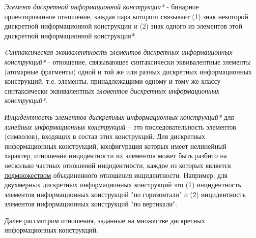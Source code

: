 \textit{Элемент дискретной информационной конструкции*} - бинарное ориентированное отношение, каждая пара которого связывает (1) знак некоторой дискретной информационной конструкции и (2) знак одного из элементов этой дискретной информационной конструкции*.

\textit{Cинтаксическая эквивалентность элементов дискретных информационных конструкций*} - отношение, связывающее синтаксически эквивалентные элементы (атомарные фрагменты) одной и той же или разных дискретных информационных конструкций, т.е. элементы, принадлежащими одному и тому же классу синтаксически эквивалентных \textit{элементов дискретных информационных конструкций*}.

\textit{Инцидентность элементов дискретных информационных конструкций*} для \textit{линейных информационных конструкций} -- это последовательность элементов (символов), входящих в состав этих конструкций. Для дискретных информационных конструкций, конфигурация которых имеет нелинейный характер, отношение инцидентности их элементов может быть разбито на несколько частных отношений инцидентности, каждое из которых является \underline{подмножеством} объединенного отношения инцидентности. Например, для двухмерных дискретных информационных конструкций это (1) инцидентность элементов информационных конструкций "по горизонтали"{} и (2) инцидентность элементов информационных конструкций "по вертикали"{}.

Далее рассмотрим отношения, заданные на множестве дискретных информационных конструкций.

\begin{SCn}


\end{SCn}

